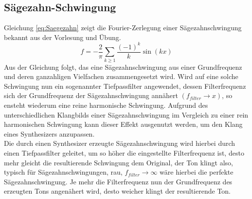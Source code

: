 \subsection{Sägezahn-Schwingung}
Gleichung \ref{eq:Saegezahn} zeigt die Fourier-Zerlegung einer Sägezahnschwingung bekannt aus der Vorlesung und Übung.
\begin{equation}
    \label{eq:Saegezahn}
    f = - \frac{2}{\pi}\sum_{k\geq1}\frac{(-1)^k}{k}\sin(kx)
\end{equation}
Aus der Gleichung folgt, das eine Sägezahnschwingung aus einer Grundfrequenz und deren ganzahligen Vielfachen zusammengesetzt wird. Wird auf eine solche Schwingung nun ein sogenannter Tiefpassfilter angewendet, dessen Filterfrequenz sich der Grundfrequenz der Sägezahnschwingung annähert $(f_{filter} \to x)$, so ensteht wiederum eine reine harmonische Schwingung. Aufgrund des unterschiedlichen Klangbilds einer Sägezahnschwingung im Vergleich zu einer rein harmonischen Schwingung kann dieser Effekt ausgenutzt werden, um den Klang eines Synthesizers anzupassen.\\
Die durch einen Synthesizer erzeugte Sägezahnschwingung wird hierbei durch einen Tiefpassfilter geleitet, um so höher die eingestellte Filterfrequenz ist, desto mehr gleicht die resultierende Schwingung dem Original, der Ton klingt also, typisch für Sägezahnschwingungen, rau, $f_{filter} \to \infty$ wäre hierbei die perfekte Sägezahnschwingung. Je mehr die Filterfrequenz nun der Grundfrequenz des erzeugten Tons angenähert wird, desto weicher klingt der resultierende Ton.